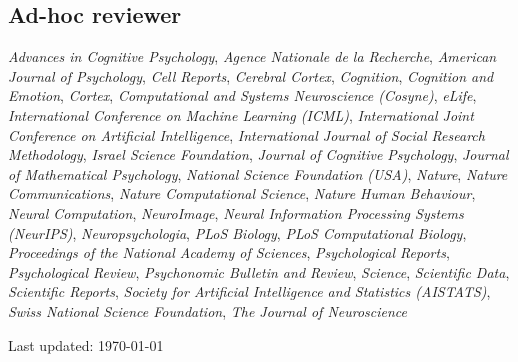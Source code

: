 \documentclass[11pt, a4paper]{article} %
\begin{document}
\subsection*{Ad-hoc reviewer}
\textit{Advances in Cognitive Psychology},
\textit{Agence Nationale de la Recherche},
\textit{American Journal of Psychology},
\textit{Cell Reports},
\textit{Cerebral Cortex},
\textit{Cognition},
\textit{Cognition and Emotion},
\textit{Cortex},
\textit{Computational and Systems Neuroscience (Cosyne)},
\textit{eLife},
\textit{International Conference on Machine Learning (ICML)},
\textit{International Joint Conference on Artificial Intelligence},
\textit{International Journal of Social Research Methodology},
\textit{Israel Science Foundation},
\textit{Journal of Cognitive Psychology},
\textit{Journal of Mathematical Psychology},
\textit{National Science Foundation (USA)},
\textit{Nature},
\textit{Nature Communications},
\textit{Nature Computational Science},
\textit{Nature Human Behaviour},
\textit{Neural Computation},
\textit{NeuroImage},
\textit{Neural Information Processing Systems (NeurIPS)},
\textit{Neuropsychologia},
\textit{PLoS Biology},
\textit{PLoS Computational Biology},
\textit{Proceedings of the National Academy of Sciences},
\textit{Psychological Reports},
\textit{Psychological Review},
\textit{Psychonomic Bulletin and Review},
\textit{Science},
\textit{Scientific Data},
\textit{Scientific Reports},
\textit{Society for Artificial Intelligence and Statistics (AISTATS)},
\textit{Swiss National Science Foundation},
\textit{The Journal of Neuroscience}



\begin{center}
{\scriptsize Last updated: \today} %
\end{center}

\end{document}
